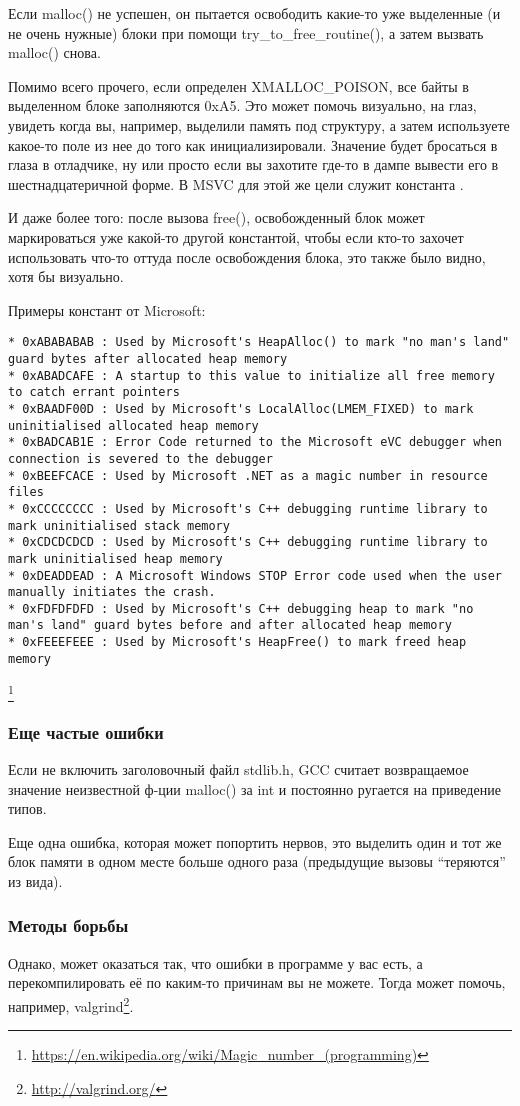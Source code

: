 Если malloc() не успешен, он пытается освободить какие-то уже выделенные (и не очень нужные) 
блоки при помощи try\_to\_free\_routine(), а затем вызвать malloc() снова.

Помимо всего прочего, если определен XMALLOC\_POISON, все байты в выделенном блоке заполняются 0xA5.
Это может помочь визуально, на глаз, увидеть когда вы, например, выделили память под структуру,
а затем используете какое-то поле из нее до того как инициализировали. Значение  будет
бросаться в глаза в отладчике, ну или просто если вы захотите где-то в дампе вывести его в шестнадцатеричной
форме. В MSVC для этой же цели служит константа .

И даже более того: после вызова free(), освобожденный блок может маркироваться уже какой-то другой константой,
чтобы если кто-то захочет использовать что-то оттуда после освобождения блока, это также было видно, хотя
бы визуально.

Примеры констант от Microsoft:

\begin{lstlisting}
* 0xABABABAB : Used by Microsoft's HeapAlloc() to mark "no man's land" guard bytes after allocated heap memory
* 0xABADCAFE : A startup to this value to initialize all free memory to catch errant pointers
* 0xBAADF00D : Used by Microsoft's LocalAlloc(LMEM_FIXED) to mark uninitialised allocated heap memory
* 0xBADCAB1E : Error Code returned to the Microsoft eVC debugger when connection is severed to the debugger
* 0xBEEFCACE : Used by Microsoft .NET as a magic number in resource files
* 0xCCCCCCCC : Used by Microsoft's C++ debugging runtime library to mark uninitialised stack memory
* 0xCDCDCDCD : Used by Microsoft's C++ debugging runtime library to mark uninitialised heap memory
* 0xDEADDEAD : A Microsoft Windows STOP Error code used when the user manually initiates the crash.
* 0xFDFDFDFD : Used by Microsoft's C++ debugging heap to mark "no man's land" guard bytes before and after allocated heap memory
* 0xFEEEFEEE : Used by Microsoft's HeapFree() to mark freed heap memory
\end{lstlisting}
\footnote{\url{https://en.wikipedia.org/wiki/Magic_number_(programming)}}

\subsubsection{Еще частые ошибки}

Если не включить заголовочный файл stdlib.h, 
GCC считает возвращаемое значение неизвестной ф-ции malloc() за int и постоянно ругается на приведение типов.

Еще одна ошибка, которая может попортить нервов, это выделить один и тот же блок памяти в одном месте 
больше одного раза (предыдущие вызовы ``теряются'' из вида).

\subsubsection{Методы борьбы}

Однако, может оказаться так, что ошибки в программе у вас есть, а перекомпилировать её по каким-то причинам
вы не можете. Тогда может помочь, например, valgrind\footnote{\url{http://valgrind.org/}}.

